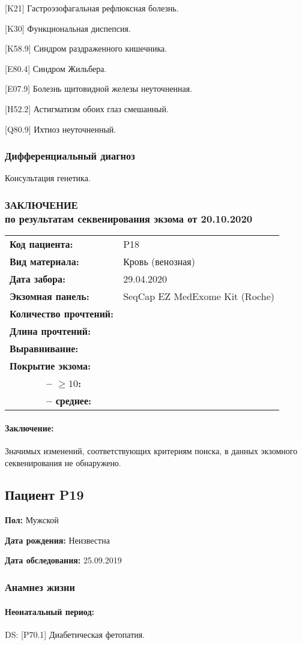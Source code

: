 \documentclass[a4paper,14pt]{extarticle}
\newcommand{\reportgen}[9]{
\begin{tabular}{ >{\bfseries}p{0.35\textwidth} l }
Код пациента: & #1 \\
Вид материала: & #2 \\
Дата забора: & #3 \\
Экзомная панель: & #4 \\
Количество прочтений: & \numprint[\mln]{#5} \\
Длина прочтений: & \numprint[bp]{#6} \\
Выравнивание: & \numprint[\%]{#7} \\
Покрытие экзома: & ~ \\
~~~~~~ -- $\geqslant10$: & \numprint[\%]{#8} \\
~~~~~~ -- среднее: & \numprint[прочтений/позицию]{#9} \\
\end{tabular}}
\newcommand{\mln}{млн}
\newcommand{\DS}[2]{[#2] #1}
\begin{document}
\DS{Гастроэзофагальная рефлюксная болезнь}{K21}.

\DS{Функциональная диспепсия}{K30}.

\DS{Синдром раздраженного кишечника}{K58.9}.

\DS{Синдром Жильбера}{E80.4}.

\DS{Болезнь щитовидной железы неуточненная}{E07.9}.

\DS{Астигматизм обоих глаз смешанный}{H52.2}. 

\DS{Ихтиоз неуточненный}{Q80.9}.

\subsubsection*{Дифференциальный диагноз}

Консультация генетика.

\newpage
\subsubsection*{ЗАКЛЮЧЕНИЕ\\по результатам секвенирования экзома от 20.10.2020}

\reportgen
{P18}
{Кровь (венозная)}{29.04.2020}
{SeqCap EZ MedExome Kit (Roche)}
{20.9}{150}{97.35}{72.46}{21}

\paragraph{Заключение:} Значимых изменений, соответствующих критериям поиска, в данных экзомного секвенирования не обнаружено.

\newpage
\subsection*{Пациент P19}

\textbf{Пол:} Мужской

\textbf{Дата рождения:} Неизвестна

\textbf{Дата обследования:} 25.09.2019

\subsubsection*{Анамнез жизни}

\paragraph{Неонатальный период:} DS: \DS{Диабетическая фетопатия}{P70.1}.
\end{document}
